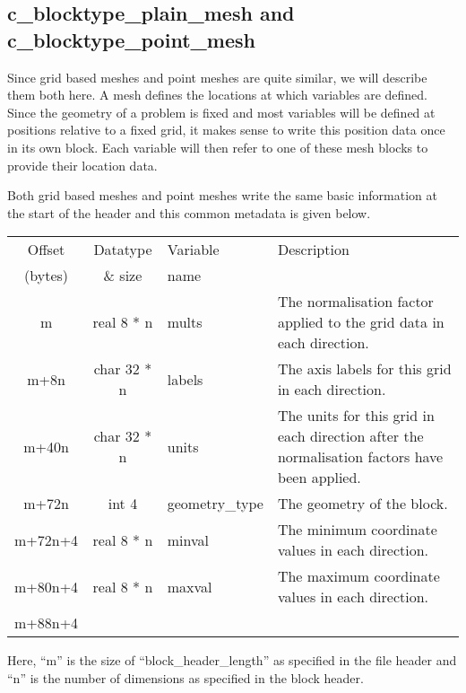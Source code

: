 \documentclass[12pt]{article}
\newcommand{\subsubsec}{\subsection}
\begin{document}
\subsubsec{c\_blocktype\_plain\_mesh and c\_blocktype\_point\_mesh}

Since grid based meshes and point meshes are quite similar, we will describe
them both here. A mesh defines the locations at which variables are defined.
Since the geometry of a problem is fixed and most variables will be defined
at positions relative to a fixed grid, it makes sense to write this position
data once in its own block. Each variable will then refer to one of these
mesh blocks to provide their location data.

Both grid based meshes and point meshes write the same basic information
at the start of the header and this common metadata is given below.\\

\begin{center}
\begin{tabularx}{0.9\textwidth}[!hbt]{cclX}
  Offset & Datatype & Variable & Description\\
  (bytes) & \& size & name &
  \\\toprule

  m & real 8 * n & mults & The normalisation factor applied to the grid data
  in each direction.
  \\\midrule

  m+8n & char 32 * n & labels & The axis labels for this grid in each direction.
  \\\midrule

  m+40n & char 32 * n & units & The units for this grid in each direction
  after the normalisation factors have been applied.
  \\\midrule

  m+72n & int 4 & geometry\_type & The geometry of the block.
  \\\midrule

  m+72n+4 & real 8 * n & minval & The minimum coordinate values in each
  direction.
  \\\midrule

  m+80n+4 & real 8 * n & maxval & The maximum coordinate values in each
  direction.
  \\\midrule

  m+88n+4 &
\end{tabularx}
\end{center}\vspace{10pt}

Here, ``m'' is the size of ``block\_header\_length'' as specified in the file
header and ``n'' is the number of dimensions as specified in the block header.
\end{document}
